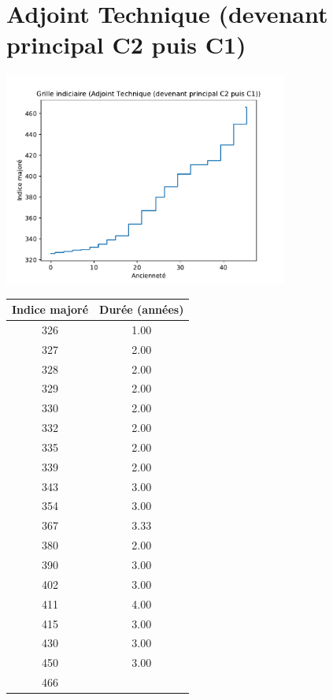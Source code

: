 \newpage 
 
\chapter{Adjoint Technique (devenant principal C2 puis C1)} 

\begin{minipage}{0.55\linewidth}\includegraphics[width=0.7\textwidth]{fig/grille_AdjTech.pdf}\end{minipage} 
\begin{minipage}{0.3\linewidth} 
 \begin{center} 

\begin{tabular}[htb]{|c|c|} 
\hline 
 Indice majoré &  Durée (années) \\ 
\hline \hline 
 326 &  1.00 \\ 
\hline 
 327 &  2.00 \\ 
\hline 
 328 &  2.00 \\ 
\hline 
 329 &  2.00 \\ 
\hline 
 330 &  2.00 \\ 
\hline 
 332 &  2.00 \\ 
\hline 
 335 &  2.00 \\ 
\hline 
 339 &  2.00 \\ 
\hline 
 343 &  3.00 \\ 
\hline 
 354 &  3.00 \\ 
\hline 
 367 &  3.33 \\ 
\hline 
 380 &  2.00 \\ 
\hline 
 390 &  3.00 \\ 
\hline 
 402 &  3.00 \\ 
\hline 
 411 &  4.00 \\ 
\hline 
 415 &  3.00 \\ 
\hline 
 430 &  3.00 \\ 
\hline 
 450 &  3.00 \\ 
\hline 
 466 &   \\ 
\hline 
\hline 
\end{tabular} 
\end{center} 
 \end{minipage} 


